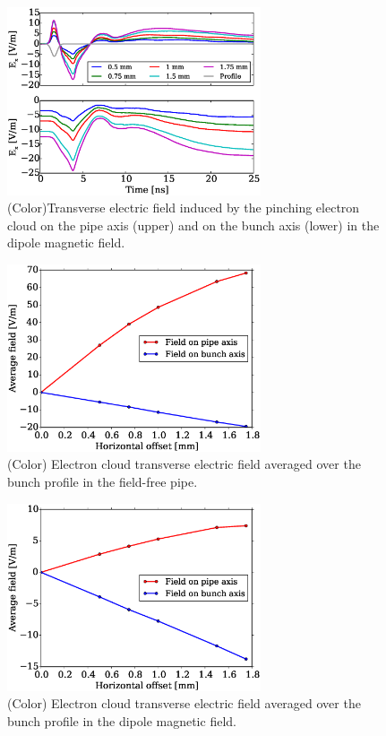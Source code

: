 \documentclass[1p]{elsarticle}%
\begin{document}
\begin{figure}[htb] 
\centering
\includegraphics*[width=75mm]{./data/round_dipole_offset.eps}
\caption{(Color)Transverse electric field induced by the pinching electron cloud on the pipe axis (upper) and on the bunch axis (lower) in the dipole magnetic field. }
\label{fig:offset_dipole}
\end{figure}

\begin{figure}[htb] 
\centering
\includegraphics*[width=75mm]{./data/round_drift_offset_average.eps}
\caption{(Color) Electron cloud transverse electric field averaged over the bunch profile in the field-free pipe. }
\label{fig:offset_drift_average}
\end{figure}

\begin{figure}[htb] 
\centering
\includegraphics*[width=75mm]{./data/round_dipole_offset_average.eps}
\caption{(Color) Electron cloud transverse electric field averaged over the bunch profile in the dipole magnetic field. }
\label{fig:offset_dipole_average}
\end{figure}
\end{document}
